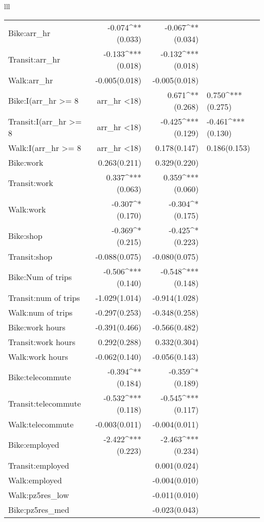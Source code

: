 \begin{longtabu}{lll}
\begin{tabular}{@{\extracolsep{1mm}}lD{.}{.}{-5} D{.}{.}{-5} }
	Bike:arr\_hr & -0.074^{**}$ $(0.033) & -0.067^{**}$ $(0.034) \\ 
	Transit:arr\_hr & -0.133^{***}$ $(0.018) & -0.132^{***}$ $(0.018) \\ 
	Walk:arr\_hr & -0.005$ $(0.018) & -0.005$ $(0.018) \\ 
	Bike:I(arr\_hr \textgreater = 8 & arr\_hr \textless  18) & 0.671^{**}$ $(0.268) & 0.750^{***}$ $(0.275) \\ 
	Transit:I(arr\_hr \textgreater = 8 & arr\_hr \textless  18) & -0.425^{***}$ $(0.129) & -0.461^{***}$ $(0.130) \\ 
	Walk:I(arr\_hr \textgreater = 8 & arr\_hr \textless  18) & 0.178$ $(0.147) & 0.186$ $(0.153) \\ 
	Bike:work & 0.263$ $(0.211) & 0.329$ $(0.220) \\ 
	Transit:work & 0.337^{***}$ $(0.063) & 0.359^{***}$ $(0.060) \\ 
	Walk:work & -0.307^{*}$ $(0.170) & -0.304^{*}$ $(0.175) \\ 
	Bike:shop & -0.369^{*}$ $(0.215) & -0.425^{*}$ $(0.223) \\ 
	Transit:shop & -0.088$ $(0.075) & -0.080$ $(0.075) \\ 
	Bike:Num of trips & -0.506^{***}$ $(0.140) & -0.548^{***}$ $(0.148) \\ 
	Transit:num of trips & -1.029$ $(1.014) & -0.914$ $(1.028) \\ 
	Walk:num of trips & -0.297$ $(0.253) & -0.348$ $(0.258) \\ 
	Bike:work hours & -0.391$ $(0.466) & -0.566$ $(0.482) \\ 
	Transit:work hours & 0.292$ $(0.288) & 0.332$ $(0.304) \\ 
	Walk:work hours & -0.062$ $(0.140) & -0.056$ $(0.143) \\ 
	Bike:telecommute & -0.394^{**}$ $(0.184) & -0.359^{*}$ $(0.189) \\ 
	Transit:telecommute & -0.532^{***}$ $(0.118) & -0.545^{***}$ $(0.117) \\ 
	Walk:telecommute & -0.003$ $(0.011) & -0.004$ $(0.011) \\ 
	Bike:employed & -2.422^{***}$ $(0.223) & -2.463^{***}$ $(0.234) \\ 
	Transit:employed &  & 0.001$ $(0.024) \\ 
	Walk:employed &  & -0.004$ $(0.010) \\ 
	Walk:pz5res\_low &  & -0.011$ $(0.010) \\ 
	Bike:pz5res\_med &  & -0.023$ $(0.043) \\ 

\end{tabular}
\end{longtabu}
